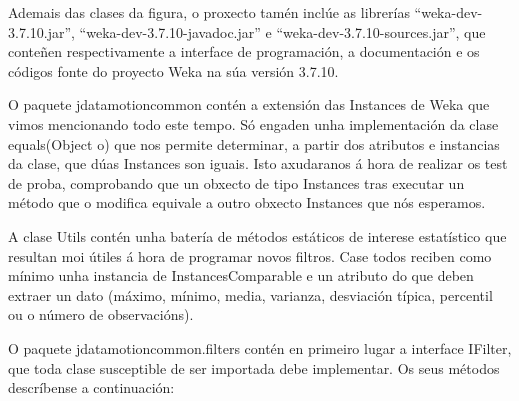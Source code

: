 Ademais das clases da figura, o proxecto tamén inclúe as librerías ``weka-dev-3.7.10.jar'', ``weka-dev-3.7.10-javadoc.jar'' e ``weka-dev-3.7.10-sources.jar'', que conteñen respectivamente a interface de programación, a documentación e os códigos fonte do proyecto Weka na súa versión 3.7.10.

O paquete jdatamotioncommon contén a extensión das Instances de Weka que vimos mencionando todo este tempo. Só engaden unha implementación da clase equals(Object o) que nos permite determinar, a partir dos atributos e instancias da clase, que dúas Instances son iguais. Isto axudaranos á hora de realizar os test de proba, comprobando que un obxecto de tipo Instances tras executar un método que o modifica equivale a outro obxecto Instances que nós esperamos.

A clase Utils contén unha batería de métodos estáticos de interese estatístico que resultan moi útiles á hora de programar novos filtros. Case todos reciben como mínimo unha instancia de InstancesComparable e un atributo do que deben extraer un dato (máximo, mínimo, media, varianza, desviación típica, percentil ou o número de observacións).

O paquete jdatamotioncommon.filters contén en primeiro lugar a interface IFilter, que toda clase susceptible de ser importada debe implementar. Os seus métodos descríbense a continuación:


